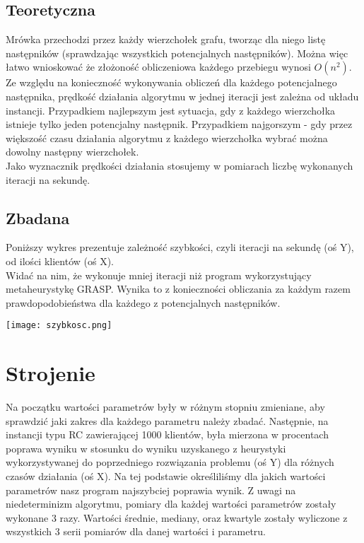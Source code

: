 \documentclass[a4paper]{article}
\begin{document}
\subsection{Teoretyczna}
Mrówka przechodzi przez każdy wierzchołek grafu, tworząc dla niego listę następników (sprawdzając wszystkich potencjalnych następników). Można więc łatwo wnioskować że złożoność obliczeniowa każdego przebiegu wynosi $O(n^2)$. Ze względu na konieczność wykonywania obliczeń dla każdego potencjalnego następnika, prędkość działania algorytmu w jednej iteracji jest zależna od układu instancji. Przypadkiem najlepszym jest sytuacja, gdy z każdego wierzchołka istnieje tylko jeden potencjalny następnik. Przypadkiem najgorszym - gdy przez większość czasu działania algorytmu z każdego wierzchołka wybrać można dowolny następny wierzchołek.\\ Jako wyznacznik prędkości działania stosujemy w pomiarach liczbę wykonanych iteracji na sekundę.
\subsection{Zbadana}
Poniższy wykres prezentuje zależność szybkości, czyli iteracji na sekundę (oś Y), od ilości klientów (oś X).\\
Widać na nim, że wykonuje mniej iteracji niż program wykorzystujący metaheurystykę GRASP. Wynika to z konieczności obliczania za każdym razem prawdopodobieństwa dla każdego z potencjalnych następników. 
\begin{center}
\texttt{[image: szybkosc.png]}
\end{center}

\section{Strojenie}
Na początku wartości parametrów były w różnym stopniu zmieniane, aby sprawdzić jaki zakres dla każdego parametru należy zbadać. Następnie, na instancji typu RC zawierającej 1000 klientów, była mierzona w procentach poprawa wyniku w stosunku do wyniku uzyskanego z heurystyki wykorzystywanej do poprzedniego rozwiązania problemu\cite{poprzednie} (oś Y) dla różnych czasów działania (oś X). Na tej podstawie określiliśmy dla jakich wartości parametrów nasz program najszybciej poprawia wynik. Z uwagi na niedeterminizm algorytmu, pomiary dla każdej wartości parametrów zostały wykonane 3 razy. Wartości średnie, mediany, oraz kwartyle zostały wyliczone z wszystkich 3 serii pomiarów dla danej wartości i parametru.
\end{document}
